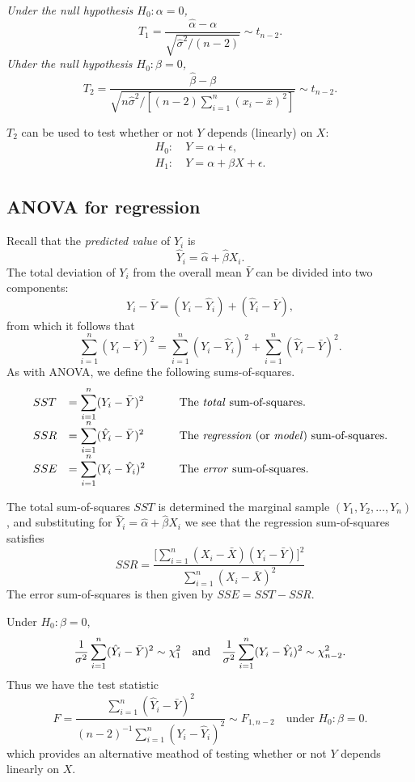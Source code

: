 \bit
\it Under the null hypothesis $H_0:\alpha=0$, 
\[
T_1 = \frac{\hat{\alpha}-\alpha}{\sqrt{\hat{\sigma}^2/(n-2)}} \sim t_{n-2}.
\]
\it Uhder the null hypothesis $H_0:\beta=0$,
\[
T_2 = \frac{\hat{\beta}-\beta}{\sqrt{n\hat{\sigma}^2/[(n-2)\sum_{i=1}^n(x_i-\bar{x})^2]}} \sim t_{n-2}.
\]
\eit

$T_2$ can be used to test whether or not $Y$ depends (linearly) on $X$:
\begin{align*}
H_0: 	&\ Y = \alpha+\epsilon, \\
H_1:	&\ Y = \alpha+\beta X + \epsilon.
\end{align*}

\subsection{ANOVA for regression}

Recall that the \emph{predicted value} of $Y_i$ is 
\[
\hat{Y}_i = \hat{\alpha} + \hat{\beta}X_i.
\]
The total deviation of $Y_i$ from the overall mean $\bar{Y}$ can be divided into two components:
\[
Y_i - \bar{Y} = (Y_i-\hat{Y}_i) + (\hat{Y}_i - \bar{Y}),
\]
from which it follows that
\[
\sum_{i=1}^n(Y_i - \bar{Y})^2 = \sum_{i=1}^n(Y_i-\hat{Y}_i)^2 + \sum_{i=1}^n(\hat{Y}_i - \bar{Y})^2.
\]
As with ANOVA, we define the following sums-of-squares.
\[
\begin{array}{lll}
SST	& = \displaystyle\sum_{i=1}^n (Y_i-\bar{Y})^2
\qquad & \text{The \emph{total} sum-of-squares.} \\
SSR	& = \displaystyle\sum_{i=1}^n (\hat{Y}_i-\bar{Y})^2
\qquad & \text{The \emph{regression} (or \emph{model}) sum-of-squares.} \\
SSE	& = \displaystyle\sum_{i=1}^n (Y_i-\hat{Y}_i)^2
\qquad & \text{The \emph{error} sum-of-squares.} 
\end{array}
\]

The total sum-of-squares $SST$ is determined the marginal sample $(Y_1,Y_2,\ldots,Y_n)$, and substituting for $\hat{Y}_i = \hat{\alpha} + \hat{\beta}X_i$ we see that the regression sum-of-squares satisfies
\[
SSR = \frac{\big[\sum_{i=1}^n (X_i-\bar{X})(Y_i-\bar{Y})\big]^2}{\sum_{i=1}^n (X_i-\bar{X})^2}
\]
The error sum-of-squares is then given by $SSE = SST - SSR$.

\bigskip
Under $H_0:\beta=0$,
\[
\frac{1}{\sigma^2}\sum_{i=1}^n (\hat{Y}_i-\bar{Y})^2	\sim \chi^2_1
\text{\quad and\quad}
\frac{1}{\sigma^2}\sum_{i=1}^n (Y_i-\hat{Y}_i)^2		\sim \chi^2_{n-2}.
\]
Thus we have the test statistic
\[
F 
	= \frac{\sum_{i=1}^n (\hat{Y}_i-\bar{Y})^2}{(n-2)^{-1}\sum_{i=1}^n (Y_i-\hat{Y}_i)^2} 
	\sim F_{1,n-2} \quad\text{under $H_0:\beta=0$.}
\]
which provides an alternative meathod of testing whether or not $Y$ depends linearly on $X$.

